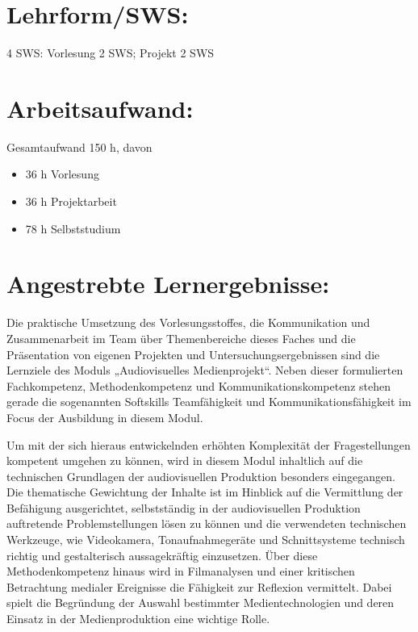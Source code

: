 \section*{Lehrform/SWS:}\label{lehrformsws}

4 SWS: Vorlesung 2 SWS; Projekt 2 SWS

\section*{Arbeitsaufwand:}\label{arbeitsaufwand}

Gesamtaufwand 150 h, davon

\begin{itemize}
\item
  36 h Vorlesung
\item
  36 h Projektarbeit
\item
  78 h Selbststudium
\end{itemize}

\section*{Angestrebte
Lernergebnisse:}\label{angestrebte-lernergebnisse-2}

Die praktische Umsetzung des Vorlesungsstoffes, die Kommunikation und
Zusammenarbeit im Team über Themenbereiche dieses Faches und die
Präsentation von eigenen Projekten und Untersuchungsergebnissen sind die
Lernziele des Moduls „Audiovisuelles Medienprojekt``. Neben dieser
formulierten Fachkompetenz, Methodenkompetenz und
Kommunikationskompetenz stehen gerade die sogenannten Softskills
Teamfähigkeit und Kommunikationsfähigkeit im Focus der Ausbildung in
diesem Modul.

Um mit der sich hieraus entwickelnden erhöhten Komplexität der
Fragestellungen kompetent umgehen zu können, wird in diesem Modul
inhaltlich auf die technischen Grundlagen der audiovisuellen Produktion
besonders eingegangen. Die thematische Gewichtung der Inhalte ist im
Hinblick auf die Vermittlung der Befähigung ausgerichtet, selbstständig
in der audiovisuellen Produktion auftretende Problemstellungen lösen zu
können und die verwendeten technischen Werkzeuge, wie Videokamera,
Tonaufnahmegeräte und Schnittsysteme technisch richtig und gestalterisch
aussagekräftig einzusetzen. Über diese Methodenkompetenz hinaus wird in
Filmanalysen und einer kritischen Betrachtung medialer Ereignisse die
Fähigkeit zur Reflexion vermittelt. Dabei spielt die Begründung der
Auswahl bestimmter Medientechnologien und deren Einsatz in der
Medienproduktion eine wichtige Rolle.

